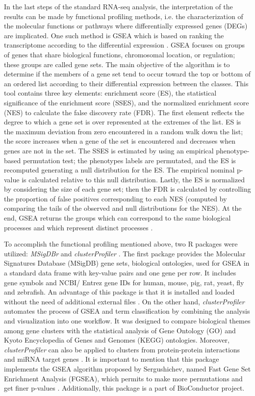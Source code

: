 In the last steps of the standard RNA-seq analysis, the interpretation of the results can be made by functional profiling methods, i.e. the characterization of the molecular functions or pathways where differentially expressed genes (DEGs) are implicated. One such method is GSEA which is based on ranking the transcriptome according to the differential expression \cite{Conesa2016}. GSEA focuses on groups of genes that share biological functions, chromosomal location, or regulation; these groups are called gene sets. The main objective of the algorithm is to determine if the members of a gene set tend to occur toward the top or bottom of an ordered list according to their differential expression between the classes. This tool contains three key elements: enrichment score (ES), the statistical significance of the enrichment score (SSES), and the normalized enrichment score (NES) to calculate the false discovery rate (FDR). The first element reflects the degree to which a gene set is over represented at the extremes of the list. ES is the maximum deviation from zero encountered in a random walk down the list; the score increases when a gene of the set is encountered and decreases when genes are not in the set. The SSES is estimated by using an empirical phenotype-based permutation test; the phenotypes labels are permutated, and the ES is recomputed generating a null distribution for the ES. The empirical nominal p-value is calculated relative to this null distribution. Lastly, the ES is normalized by considering the size of each gene set; then the FDR is calculated by controlling the proportion of false positives corresponding to each NES (computed by comparing the tails of the observed and null distributions for the NES). At the end, GSEA returns the groups which can correspond to the same biological processes and which represent distinct processes \cite{Subramanian}.

To accomplish the functional profiling mentioned above, two R packages were utilized: \textit{MSigDBr} \cite{msigdbr} and \textit{clusterProfiler} \cite{clusterprofiler}. The first package provides the Molecular Signatures Database (MSigDB) gene sets, biological ontologies, used for GSEA in a standard data frame with key-value pairs and one gene per row. It includes gene symbols and NCBI/ Entrez gene IDs for human, mouse, pig, rat, yeast, fly and zebrafish. An advantage of this package is that it is installed and loaded without the need of additional external files \cite{msigdbr}. On the other hand, \textit{clusterProfiler} automates the process of GSEA and term classification by combining the analysis and visualization into one workflow. It was designed to compare biological themes among gene clusters with the statistical analysis of Gene Ontology (GO) \cite{GO} and Kyoto Encyclopedia of Genes and Genomes (KEGG) \cite{KEGG} ontologies. Moreover, \textit{clusterProfiler} can also be applied to clusters from protein-protein interactions and miRNA target genes \cite{yu}. It is important to mention that this package implements the GSEA algorithm proposed by Sergushichev, named Fast Gene Set Enrichment Analysis (FGSEA), which permits to make more permutations and get finer p-values \cite{fgsea}. Additionally, this package is a part of BioConductor project.

